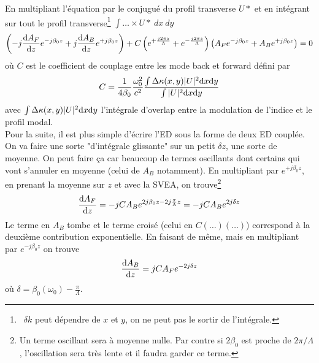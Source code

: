 En multipliant l'équation par le conjugué du profil transverse $U*$ et en intégrant sur tout le
profil transverse\footnote{\danger\ $\delta k$ peut dépendre de $x$ et $y$, on ne peut pas le sortir
de l'intégrale.} $\int\dots \times U*\ dx\ dy$ 
\begin{equation}
\left( { - j\frac{{{\rm{d}}{A_F}}}{{{\rm{d}}z}}{e^{ - j{\beta _0}z}} + j\frac{{{\rm{d}}{A_B}}}{{{\rm{d}}z}}{e^{ + j{\beta _0}z}}} \right) + C\left( {{e^{ + \frac{{j2\pi z}}{\Lambda }}} + {e^{ - \frac{{j2\pi z}}{\Lambda }}}} \right)\left( {{A_F}{e^{ - j{\beta _0}z}} + {A_B}{e^{ + j{\beta _0}z}}} \right) = 0
\end{equation}
où $C$ est le coefficient de couplage entre les mode back et forward défini par 
\begin{equation}
C = \frac{1}{{4{\beta _0}}}\frac{{\omega _0^2}}{{{c^2}}}\frac{{\int {\Delta \kappa (x,y)|U{|^2}{\rm{d}}x{\rm{d}}y} }}{{\int {|U{|^2}{\rm{d}}x{\rm{d}}y} }}
\end{equation}
avec ${\int {\Delta \kappa (x,y)|U{|^2}{\rm{d}}x{\rm{d}}y} }$ l'intégrale d'overlap entre la 
modulation de l'indice et le profil modal.\\

Pour la suite, il est plus simple d'écrire l'ED sous la forme de deux ED couplée. On va faire une
sorte "d'intégrale glissante" sur un petit $\delta z$, une sorte de moyenne. On peut faire ça car
beaucoup de termes oscillants dont certains qui vont s'annuler en moyenne (celui de $A_B$ notamment).
En multipliant par $e^{+j\beta_0z}$, en prenant la moyenne sur $z$ et avec la SVEA, 
on trouve\footnote{Un terme oscillant sera à moyenne nulle. Par contre si $2\beta_0$ est proche de
$2\pi/\Lambda$, l'oscillation sera très lente et il faudra garder ce terme.}
\begin{equation}
\frac{{{\rm{d}}{A_F}}}{{{\rm{d}}z}} =  - jC{A_B}{e^{2j{\beta _0}z - 2j\frac{\pi }{\Lambda }z}} =  -
 jC{A_B}{e^{2j\delta z}}
\end{equation}
Le terme en $A_B$ tombe et le terme croisé (celui en $C(\dots)(\dots)$) correspond à la deuxième
contribution exponentielle. En faisant de même, mais en multipliant par $e^{-j\beta_0z}$ on trouve
\begin{equation}
\frac{{{\rm{d}}{A_B}}}{{{\rm{d}}z}} = jC{A_F}{e^{ - 2j\delta z}}
\end{equation}
où $\delta  = {\beta _0}({\omega _0}) - \frac{\pi }{\Lambda }$.\\


